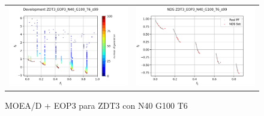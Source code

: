 \begin{figure}[H]
\begin{tabular}{c c}
    \includegraphics[scale=0.5]{figures/ZDT3_EOP3_N40_G100_T6/s99_dev.png} &
    \includegraphics[scale=0.5]{figures/ZDT3_EOP3_N40_G100_T6/s99_nds.png}\\
    \end{tabular}
    \caption{MOEA/D + EOP3 para ZDT3 con N40 G100 T6 }
    \label{fig:12}
\end{figure}

